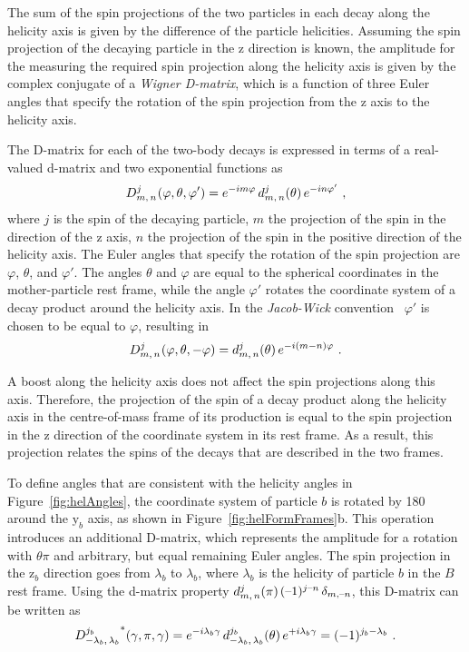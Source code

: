 The sum of the spin projections of the two particles in each decay along the helicity axis is given by the difference of the particle
helicities. Assuming the spin projection of the decaying particle in the z direction is known, the amplitude for the measuring the required
spin projection along the helicity axis is given by the complex conjugate of a \emph{Wigner D-matrix}, which is a function of three Euler
angles that specify the rotation of the spin projection from the z axis to the helicity axis.

The D-matrix for each of the two-body decays is expressed in terms of a real-valued d-matrix and two exponential functions as
\begin{equation}
  \label{eq:Ddef}
  \WD{j}{m}{n}{}(\varphi,\theta,\varphi') = e^{-im\varphi}\, \Wd{j}{m}{n}(\theta)\, e^{-in\varphi'}\ ,
\end{equation}
where $j$ is the spin of the decaying particle, $m$ the projection of the spin in the direction of the z axis, $n$ the projection of the
spin in the positive direction of the helicity axis. The Euler angles that specify the rotation of the spin projection are $\varphi$,
$\theta$, and $\varphi'$. The angles $\theta$ and $\varphi$ are equal to the spherical coordinates in the mother-particle rest frame, while
the angle $\varphi'$ rotates the coordinate system of a decay product around the helicity axis. In the \emph{Jacob-Wick}
convention~\cite{Jacob:1959at} $\varphi'$ is chosen to be equal to \tm$\varphi$, resulting in
\begin{equation}
  \label{eq:DdefJW}
  \WD{j}{m}{n}{}(\varphi,\theta,-\varphi) = \Wd{j}{m}{n}(\theta)\, e^{-i(m-n)\varphi}\ .
\end{equation}

A boost along the helicity axis does not affect the spin projections along this axis. Therefore, the projection of the spin of a decay
product along the helicity axis in the centre-of-mass frame of its production is equal to the spin projection in the z direction of the
coordinate system in its rest frame. As a result, this projection relates the spins of the decays that are described in the two frames.

To define angles that are consistent with the helicity angles in Figure~\ref{fig:helAngles}, the coordinate system of particle $b$ is
rotated by 180\textdegree{} around the $\mathrm{y}_b$ axis, as shown in Figure~\ref{fig:helFormFrames}b. This operation introduces an
additional D-matrix, which represents the amplitude for a rotation with $\theta$\texteq$\pi$ and arbitrary, but equal remaining Euler
angles. The spin projection in the $\mathrm{z}_b$ direction goes from \tm$\lambda_b$ to \tp$\lambda_b$, where $\lambda_b$ is the helicity
of particle $b$ in the $B$ rest frame. Using the d-matrix property
$\Wd{j}{m}{n}(\pi)$\texteq$(\text{\tm1})^{j\text{\tm}n}\,\delta_{m,\text{\tm}n}$, this D-matrix can be written as
\begin{equation}
  \WD{j_b}{-\lambda_b}{\lambda_b}{*}(\gamma,\pi,\gamma)
      = e^{-i\lambda_b\gamma}\, \Wd{j_b}{-\lambda_b}{\lambda_b}(\theta)\, e^{+i\lambda_b\gamma}
      = (-1)^{j_b-\lambda_b}\ .
\end{equation}

